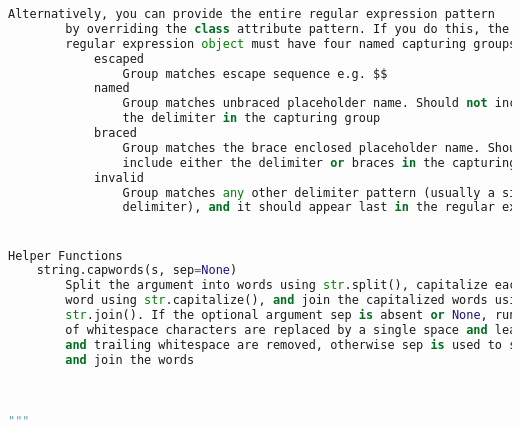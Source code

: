 \documentclass[a4paper,landscape]{report}
\begin{document}
\begin{lstlisting}[language=Python]
        Alternatively, you can provide the entire regular expression pattern
        by overriding the class attribute pattern. If you do this, the
        regular expression object must have four named capturing groups.
            escaped
                Group matches escape sequence e.g. $$
            named
                Group matches unbraced placeholder name. Should not include
                the delimiter in the capturing group
            braced
                Group matches the brace enclosed placeholder name. Should not
                include either the delimiter or braces in the capturing group
            invalid
                Group matches any other delimiter pattern (usually a single
                delimiter), and it should appear last in the regular expression


Helper Functions
    string.capwords(s, sep=None)
        Split the argument into words using str.split(), capitalize each
        word using str.capitalize(), and join the capitalized words using
        str.join(). If the optional argument sep is absent or None, runs
        of whitespace characters are replaced by a single space and leading
        and trailing whitespace are removed, otherwise sep is used to split
        and join the words

            
                
"""
\end{lstlisting}
\end{document}
